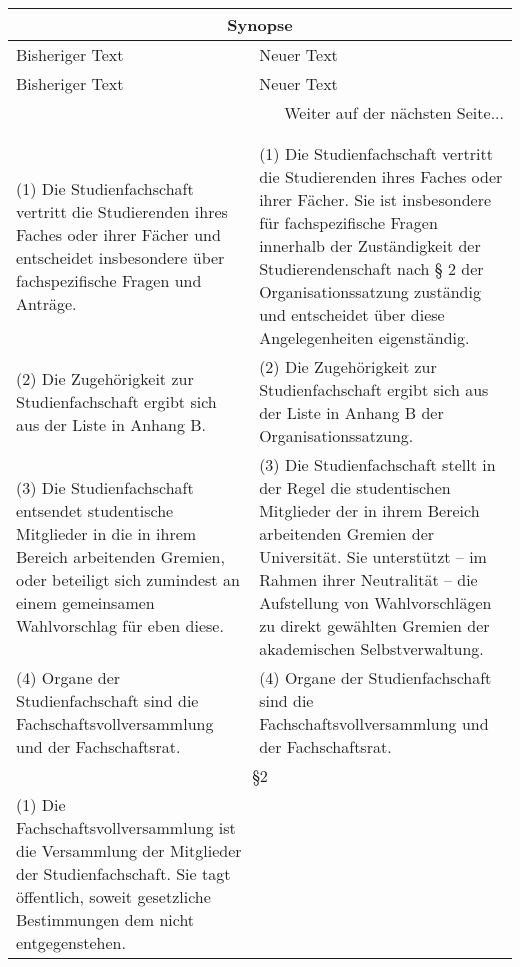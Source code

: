     {\begin{longtable}{|p{7.5cm}|p{7.5cm}|}
        \hline
        \multicolumn{2}{|c|}{Synopse}\\\hline
        Bisheriger Text & Neuer Text \\\hline
        \endfirsthead
        \hline
        Bisheriger Text & Neuer Text \\
        \hline
        \endhead
        \hline
        \multicolumn{2}{|r|}{Weiter auf der nächsten Seite...}\\
        \hline
        \endfoot
        \hline
        \multicolumn{2}{c}{Ende der Synopse} \\
        \endlastfoot
        \multicolumn{2}{|c|}{§1}\\\hline
        (1) Die Studienfachschaft vertritt die Studierenden ihres Faches oder ihrer Fächer und
        entscheidet insbesondere über fachspezifische Fragen und Anträge.&
        (1) Die Studienfachschaft vertritt die Studierenden ihres Faches oder ihrer Fächer.
        Sie ist insbesondere für fachspezifische Fragen innerhalb der Zuständigkeit der
        Studierendenschaft nach § 2 der Organisationssatzung zuständig und entscheidet über
        diese Angelegenheiten eigenständig.\\
        (2) Die Zugehörigkeit zur Studienfachschaft ergibt sich aus der Liste in Anhang B.&
        (2) Die Zugehörigkeit zur Studienfachschaft ergibt sich aus der Liste in Anhang B
        der Organisationssatzung.\\
        (3) Die Studienfachschaft entsendet studentische Mitglieder in die in ihrem Bereich arbeitenden
        Gremien, oder beteiligt sich zumindest an einem gemeinsamen Wahlvorschlag für eben diese.&
        (3) Die Studienfachschaft stellt in der Regel die studentischen Mitglieder der in
        ihrem Bereich arbeitenden Gremien der Universität. Sie unterstützt – im Rahmen
        ihrer Neutralität – die Aufstellung von Wahlvorschlägen zu direkt gewählten
        Gremien der akademischen Selbstverwaltung.\\
        (4) Organe der Studienfachschaft sind die Fachschaftsvollversammlung und der Fachschaftsrat.
        &
        (4) Organe der Studienfachschaft sind die Fachschaftsvollversammlung und
        der Fachschaftsrat.\\\hline
        \multicolumn{2}{|c|}{§2}\\\hline
        (1) Die Fachschaftsvollversammlung ist die Versammlung der Mitglieder der Studienfachschaft.
        Sie tagt öffentlich, soweit gesetzliche Bestimmungen dem nicht entgegenstehen.&

\end{longtable}}
